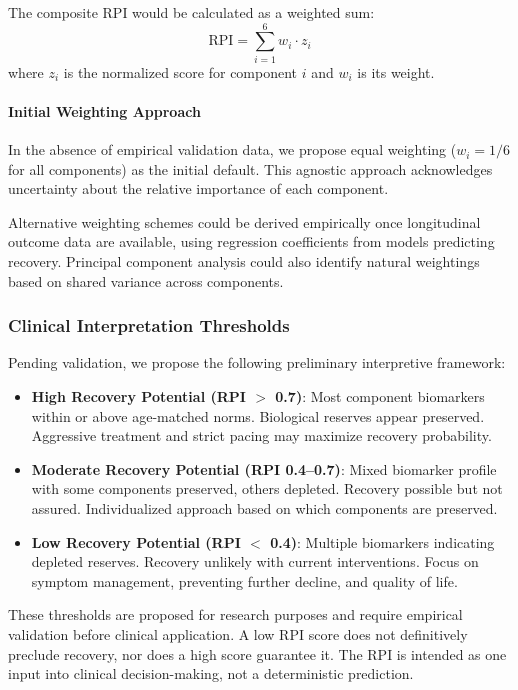 The composite RPI would be calculated as a weighted sum:
\[
\text{RPI} = \sum_{i=1}^{6} w_i \cdot z_i
\]
where $z_i$ is the normalized score for component $i$ and $w_i$ is its weight.

\paragraph{Initial Weighting Approach}
In the absence of empirical validation data, we propose equal weighting ($w_i = 1/6$ for all components) as the initial default. This agnostic approach acknowledges uncertainty about the relative importance of each component.

Alternative weighting schemes could be derived empirically once longitudinal outcome data are available, using regression coefficients from models predicting recovery. Principal component analysis could also identify natural weightings based on shared variance across components.

\subsubsection{Clinical Interpretation Thresholds}

Pending validation, we propose the following preliminary interpretive framework:
\begin{itemize}
    \item \textbf{High Recovery Potential (RPI $>$ 0.7)}: Most component biomarkers within or above age-matched norms. Biological reserves appear preserved. Aggressive treatment and strict pacing may maximize recovery probability.
    \item \textbf{Moderate Recovery Potential (RPI 0.4--0.7)}: Mixed biomarker profile with some components preserved, others depleted. Recovery possible but not assured. Individualized approach based on which components are preserved.
    \item \textbf{Low Recovery Potential (RPI $<$ 0.4)}: Multiple biomarkers indicating depleted reserves. Recovery unlikely with current interventions. Focus on symptom management, preventing further decline, and quality of life.
\end{itemize}

\begin{warning}
These thresholds are proposed for research purposes and require empirical validation before clinical application. A low RPI score does not definitively preclude recovery, nor does a high score guarantee it. The RPI is intended as one input into clinical decision-making, not a deterministic prediction.
\end{warning}


